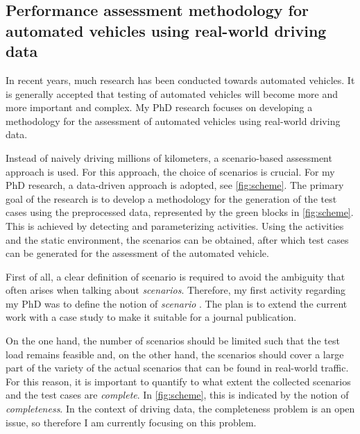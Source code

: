 \documentclass[10pt,final,a4paper,oneside,onecolumn]{article}
\begin{document}
\subsection*{Performance assessment methodology for automated vehicles using real-world driving data}

In recent years, much research has been conducted towards automated vehicles. It is generally accepted that testing of automated vehicles will become more and more important and complex. My PhD research focuses on developing a methodology for the assessment of automated vehicles using real-world driving data.

Instead of naively driving millions of kilometers, a scenario-based assessment approach is used. For this approach, the choice of scenarios is crucial. For my PhD research, a data-driven approach is adopted, see \cref{fig:scheme}. The primary goal of the research is to develop a methodology for the generation of the test cases using the preprocessed data, represented by the green blocks in \cref{fig:scheme}. This is achieved by detecting and parameterizing activities. Using the activities and the static environment, the scenarios can be obtained, after which test cases can be generated for the assessment of the automated vehicle.

First of all, a clear definition of scenario is required to avoid the ambiguity that often arises when talking about \emph{scenarios}. Therefore, my first activity regarding my PhD was to define the notion of \emph{scenario} \cite{degelder2018ontology}. The plan is to extend the current work \cite{degelder2018ontology} with a case study to make it suitable for a journal publication.

On the one hand, the number of scenarios should be limited such that the test load remains feasible and, on the other hand, the scenarios should cover a large part of the variety of the actual scenarios that can be found in real-world traffic. For this reason, it is important to quantify to what extent the collected scenarios and the test cases are \emph{complete}. In \cref{fig:scheme}, this is indicated by the notion of \emph{completeness}. In the context of driving data, the completeness problem is an open issue, so therefore I am currently focusing on this problem. 
\end{document}
